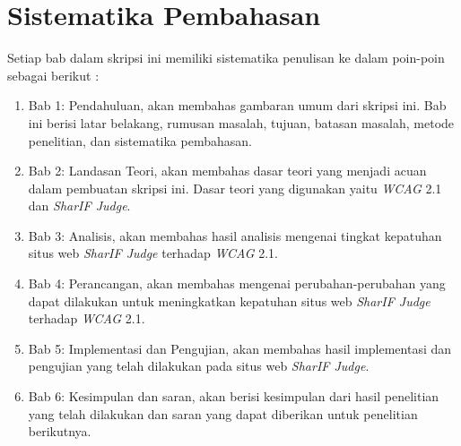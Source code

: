\section{Sistematika Pembahasan}
\label{sec:sispem}
Setiap bab dalam skripsi ini memiliki sistematika penulisan ke dalam poin-poin sebagai berikut :

\begin{enumerate}
	\item Bab 1: Pendahuluan, akan membahas gambaran umum dari skripsi ini. Bab ini berisi latar
	belakang, rumusan masalah, tujuan, batasan masalah, metode penelitian, dan sistematika
	pembahasan.
	\item Bab 2: Landasan Teori, akan membahas dasar teori yang menjadi acuan dalam pembuatan
	skripsi ini. Dasar teori yang digunakan yaitu \textit{WCAG} 2.1 dan \textit{SharIF Judge}.
	\item Bab 3: Analisis, akan membahas hasil analisis mengenai tingkat kepatuhan situs web \textit{SharIF Judge} terhadap \textit{WCAG} 2.1.

	\item Bab 4: Perancangan, akan membahas mengenai perubahan-perubahan yang dapat dilakukan
	untuk meningkatkan kepatuhan situs web \textit{SharIF Judge} terhadap \textit{WCAG} 2.1.
	\item Bab 5: Implementasi dan Pengujian, akan membahas hasil implementasi dan pengujian yang
	telah dilakukan pada situs web \textit{SharIF Judge}.
	\item Bab 6: Kesimpulan dan saran, akan berisi kesimpulan dari hasil penelitian yang telah dilakukan
	dan saran yang dapat diberikan untuk penelitian berikutnya.
\end{enumerate}
